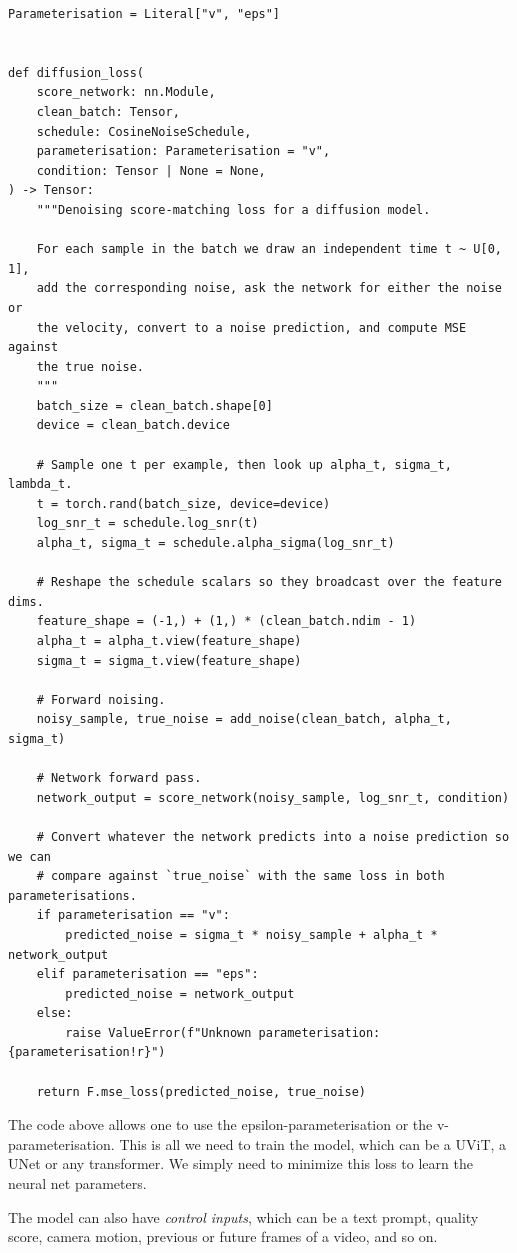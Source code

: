 \documentclass[usenames,dvipsnames]{article}
\begin{document}
\begin{verbatim}
Parameterisation = Literal["v", "eps"]


def diffusion_loss(
    score_network: nn.Module,
    clean_batch: Tensor,
    schedule: CosineNoiseSchedule,
    parameterisation: Parameterisation = "v",
    condition: Tensor | None = None,
) -> Tensor:
    """Denoising score-matching loss for a diffusion model.

    For each sample in the batch we draw an independent time t ~ U[0, 1],
    add the corresponding noise, ask the network for either the noise or
    the velocity, convert to a noise prediction, and compute MSE against
    the true noise.
    """
    batch_size = clean_batch.shape[0]
    device = clean_batch.device

    # Sample one t per example, then look up alpha_t, sigma_t, lambda_t.
    t = torch.rand(batch_size, device=device)
    log_snr_t = schedule.log_snr(t)
    alpha_t, sigma_t = schedule.alpha_sigma(log_snr_t)

    # Reshape the schedule scalars so they broadcast over the feature dims.
    feature_shape = (-1,) + (1,) * (clean_batch.ndim - 1)
    alpha_t = alpha_t.view(feature_shape)
    sigma_t = sigma_t.view(feature_shape)

    # Forward noising.
    noisy_sample, true_noise = add_noise(clean_batch, alpha_t, sigma_t)

    # Network forward pass.
    network_output = score_network(noisy_sample, log_snr_t, condition)

    # Convert whatever the network predicts into a noise prediction so we can
    # compare against `true_noise` with the same loss in both parameterisations.
    if parameterisation == "v":
        predicted_noise = sigma_t * noisy_sample + alpha_t * network_output
    elif parameterisation == "eps":
        predicted_noise = network_output
    else:
        raise ValueError(f"Unknown parameterisation: {parameterisation!r}")

    return F.mse_loss(predicted_noise, true_noise)
\end{verbatim}
The code above allows one to use the epsilon-parameterisation or the v-parameterisation.
This is all we need to train the model, which can be a UViT, a UNet or any transformer. We simply need to minimize this loss to learn the neural net parameters.

The model can also have \emph{control inputs}, which can be a text prompt, quality score, camera motion, previous or future frames of a video, and so on.
\end{document}
